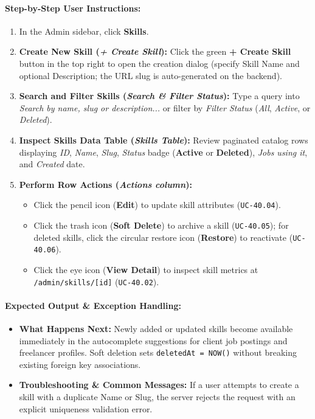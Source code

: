 \paragraph{Step-by-Step User Instructions:}
\begin{enumerate}[leftmargin=1.8em,itemsep=3pt]
  \item In the Admin sidebar, click \textbf{Skills}.
  \item {} \textbf{Create New Skill (\textit{+ Create Skill}):} Click the green \textbf{+ Create Skill} button in the top right to open the creation dialog (specify Skill Name and optional Description; the URL slug is auto-generated on the backend).
  \item {} \textbf{Search and Filter Skills (\textit{Search \& Filter Status}):} Type a query into \textit{Search by name, slug or description...} or filter by \textit{Filter Status} (\textit{All}, \textit{Active}, or \textit{Deleted}).
  \item {} \textbf{Inspect Skills Data Table (\textit{Skills Table}):} Review paginated catalog rows displaying \textit{ID}, \textit{Name}, \textit{Slug}, \textit{Status} badge (\textbf{Active} or \textbf{Deleted}), \textit{Jobs using it}, and \textit{Created} date.
  \item {} \textbf{Perform Row Actions (\textit{Actions column}):}
    \begin{itemize}
      \item Click the pencil icon (\textbf{Edit}) to update skill attributes (\texttt{UC-40.04}).
      \item Click the trash icon (\textbf{Soft Delete}) to archive a skill (\texttt{UC-40.05}); for deleted skills, click the circular restore icon (\textbf{Restore}) to reactivate (\texttt{UC-40.06}).
      \item Click the eye icon (\textbf{View Detail}) to inspect skill metrics at \texttt{/admin/skills/[id]} (\texttt{UC-40.02}).
    \end{itemize}
\end{enumerate}

\paragraph{Expected Output \& Exception Handling:}
\begin{itemize}[leftmargin=1.5em,itemsep=2pt]
  \item \textbf{What Happens Next:} Newly added or updated skills become available immediately in the autocomplete suggestions for client job postings and freelancer profiles. Soft deletion sets \texttt{deletedAt = NOW()} without breaking existing foreign key associations.
  \item \textbf{Troubleshooting \& Common Messages:} If a user attempts to create a skill with a duplicate Name or Slug, the server rejects the request with an explicit uniqueness validation error.
\end{itemize}

